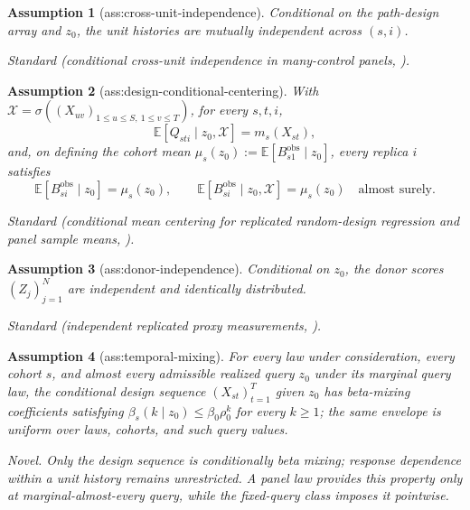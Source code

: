 \documentclass{article}
\newtheorem{assumption}{Assumption}
\begin{document}
\begin{assumption}[ass:cross-unit-independence]\label{ass:cross-unit-independence}
Conditional on the path-design array and \(z_0\), the unit histories are mutually independent across \((s,i)\).
\par\smallskip\noindent\emph{Standard} (conditional cross-unit independence in many-control panels, \cite{Ferman2021}).
\end{assumption}

\begin{assumption}[ass:design-conditional-centering]\label{ass:design-conditional-centering}
With \(\mathcal X=\sigma((X_{uv})_{1\le u\le S,\ 1\le v\le T})\), for every \(s,t,i\),
\[
 \mathbb E[Q_{sti}\mid z_0,\mathcal X]=m_s(X_{st}),
\]
and, on defining the cohort mean
\(\mu_s(z_0):=\mathbb E[B_{s1}^{\mathrm{obs}}\mid z_0]\), every replica \(i\) satisfies
\[
 \mathbb E[B_{si}^{\mathrm{obs}}\mid z_0]
 =\mu_s(z_0),
 \qquad
 \mathbb E[B_{si}^{\mathrm{obs}}\mid z_0,\mathcal X]
 =\mu_s(z_0)
 \quad\text{almost surely}.
\]
\par\smallskip\noindent\emph{Standard} (conditional mean centering for replicated random-design regression and panel sample means, \cite{Ferman2021}).
\end{assumption}

\begin{assumption}[ass:donor-independence]\label{ass:donor-independence}
Conditional on \(z_0\), the donor scores \((Z_j)_{j=1}^{N}\) are independent and identically distributed.
\par\smallskip\noindent\emph{Standard} (independent replicated proxy measurements, \cite{DelaigleHallMeister2008}).
\end{assumption}

\begin{assumption}[ass:temporal-mixing]\label{ass:temporal-mixing}
For every law under consideration, every cohort \(s\), and almost every admissible realized query \(z_0\) under its marginal query law, the conditional design sequence \((X_{st})_{t=1}^{T}\) given \(z_0\) has beta-mixing coefficients satisfying \(\beta_s(k\mid z_0)\le\beta_0\rho_0^k\) for every \(k\ge1\); the same envelope is uniform over laws, cohorts, and such query values.
\par\smallskip\noindent\emph{Novel.} Only the design sequence is conditionally beta mixing; response dependence within a unit history remains unrestricted.  A panel law provides this property only at marginal-almost-every query, while the fixed-query class imposes it pointwise.
\end{assumption}
\end{document}
